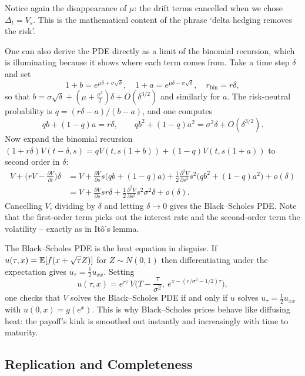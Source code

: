 \documentclass[a4paper]{scrartcl}
\begin{document}
Notice again the disappearance of $\mu$: the drift terms cancelled when we chose $\Delta_t = V_s$. This is the mathematical content of the phrase `delta hedging removes the risk'.

\begin{remark}
	One can also derive the PDE directly as a limit of the binomial recursion, which is illuminating because it shows where each term comes from. Take a time step $\delta$ and set
	$$
	1+b = e^{\mu\delta + \sigma\sqrt\delta}, \quad 1+a = e^{\mu\delta - \sigma\sqrt\delta}, \quad r_{\mathrm{bin}} = r\delta,
	$$
	so that $b = \sigma\sqrt\delta + (\mu + \tfrac{\sigma^2}{2})\delta + O(\delta^{3/2})$ and similarly for $a$. The risk-neutral probability is $q = (r\delta - a)/(b-a)$, and one computes
	$$
	qb + (1-q)a = r\delta, \qquad qb^2 + (1-q)a^2 = \sigma^2\delta + O(\delta^{3/2}).
	$$
	Now expand the binomial recursion $(1+r\delta)V(t-\delta,s) = qV(t,s(1+b)) + (1-q)V(t,s(1+a))$ to second order in $\delta$:
	\begin{align*}
		V + \Big(rV - \frac{\partial V}{\partial t}\Big)\delta &= V + \frac{\partial V}{\partial s}s\big(qb+(1-q)a\big) + \frac12\frac{\partial^2V}{\partial s^2}s^2\big(qb^2+(1-q)a^2\big) + o(\delta)\\
		&= V + \frac{\partial V}{\partial s}sr\delta + \frac12\frac{\partial^2V}{\partial s^2}s^2\sigma^2\delta + o(\delta).
	\end{align*}
	Cancelling $V$, dividing by $\delta$ and letting $\delta\to0$ gives the Black--Scholes PDE. Note that the first-order term picks out the interest rate and the second-order term the volatility -- exactly as in It\^o's lemma.
\end{remark}

\begin{remark}
	The Black--Scholes PDE is the heat equation in disguise. If $u(\tau,x) = \mathbb{E}[f(x+\sqrt\tau Z)]$ for $Z\sim N(0,1)$ then differentiating under the expectation gives $u_\tau = \tfrac12 u_{xx}$. Setting
	$$
	u(\tau,x) = e^{r\tau}\,V\Big(T - \frac{\tau}{\sigma^2},\ e^{x - (r/\sigma^2 - 1/2)\tau}\Big),
	$$
	one checks that $V$ solves the Black--Scholes PDE if and only if $u$ solves $u_\tau = \tfrac12u_{xx}$ with $u(0,x) = g(e^x)$. This is why Black--Scholes prices behave like diffusing heat: the payoff's kink is smoothed out instantly and increasingly with time to maturity.
\end{remark}

\subsection{Replication and Completeness}
\end{document}
